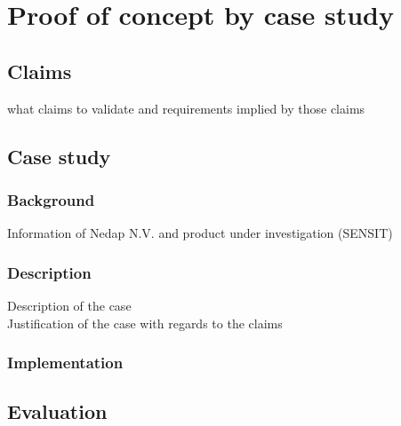 \chapter{Proof of concept by case study}
\label{ch:validation}
\section{Claims}
what claims to validate and requirements implied by those claims
\section{Case study}
\subsection{Background}
Information of Nedap N.V. and product under investigation (SENSIT)
\subsection{Description}
Description of the case \\
Justification of the case with regards to the claims
\subsection{Implementation}
\section{Evaluation}
